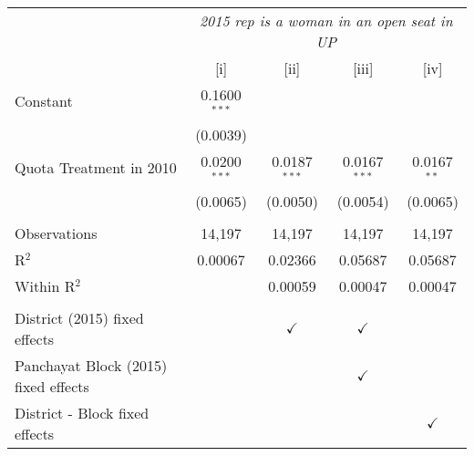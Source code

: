 
\begingroup
\centering
\begin{tabular}{lcccc}
   \toprule
    & \multicolumn{4}{c}{\textit{2015 rep is a woman in an open seat in UP}}\\
                                        & [i]            & [ii]           & [iii]          & [iv]\\  
   \midrule 
   Constant                             & 0.1600$^{***}$ &                &                &   \\   
                                        & (0.0039)       &                &                &   \\   
   Quota Treatment in 2010              & 0.0200$^{***}$ & 0.0187$^{***}$ & 0.0167$^{***}$ & 0.0167$^{**}$\\   
                                        & (0.0065)       & (0.0050)       & (0.0054)       & (0.0065)\\   
    \\
   Observations                         & 14,197         & 14,197         & 14,197         & 14,197\\  
   R$^2$                                & 0.00067        & 0.02366        & 0.05687        & 0.05687\\  
   Within R$^2$                         &                & 0.00059        & 0.00047        & 0.00047\\  
    \\
   District (2015) fixed effects        &                & $\checkmark$   & $\checkmark$   & \\  
   Panchayat Block (2015) fixed effects &                &                & $\checkmark$   & \\  
   District - Block fixed effects       &                &                &                & $\checkmark$\\   
   \bottomrule
\end{tabular}
\par\endgroup


